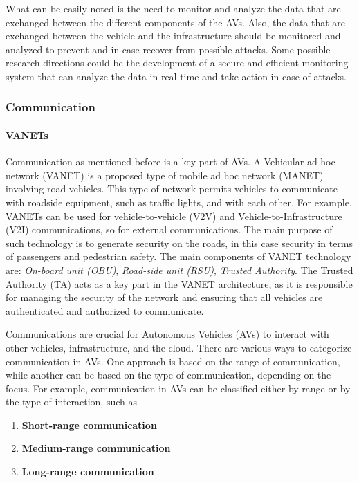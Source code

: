 What can be easily noted is the need to monitor and analyze the data that are exchanged between the different components of the AVs.
Also, the data that are exchanged between the vehicle and the infrastructure should be monitored and analyzed to prevent and in case recover from possible attacks.
Some possible research directions could be the development of a secure and efficient monitoring system that can analyze the data in real-time and take action in case of attacks.

\subsubsection{Communication}\label{subsubsec:communication}

\paragraph{VANETs}

Communication as mentioned before is a key part of AVs.
A Vehicular ad hoc network (VANET) is a proposed type of mobile ad hoc network (MANET) involving road vehicles.
This type of network permits vehicles to communicate with roadside equipment, such as traffic lights, and with each other\cite{sheikh2019comprehensive}.
For example, VANETs can be used for vehicle-to-vehicle (V2V) and Vehicle-to-Infrastructure (V2I) communications, so for external communications.
The main purpose of such technology is to generate security on the roads, in this case security in terms of passengers and pedestrian safety.
The main components of VANET technology are: \textit{On-board unit (OBU)}, \textit{Road-side unit (RSU)}, \textit{Trusted Authority}.
The Trusted Authority (TA) acts as a key part in the VANET architecture,
as it is responsible for managing the security of the network and ensuring that all vehicles are authenticated
and authorized to communicate.

Communications are crucial for Autonomous Vehicles (AVs) to interact with other vehicles, infrastructure, and the cloud.
There are various ways to categorize communication in AVs. One approach is based on the range of communication, while another can be based on the type of communication, depending on the focus.
For example, communication in AVs can be classified either by range or by the type of interaction, such as
\begin{enumerate}
    \item \textbf{Short-range communication}
    \item \textbf{Medium-range communication}
    \item \textbf{Long-range communication}
\end{enumerate}

